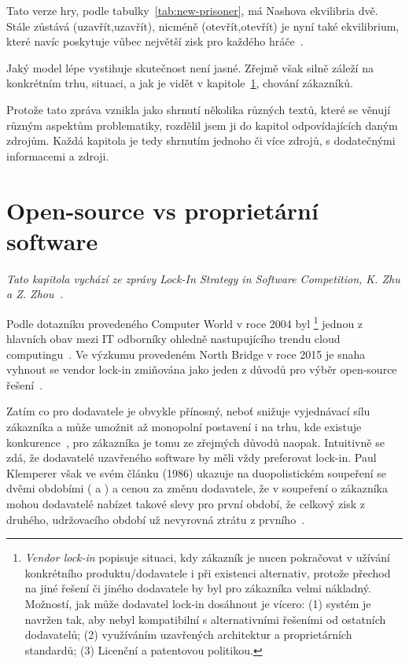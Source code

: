 \begin{multicols}{2}
Tato verze hry, podle tabulky~\ref{tab:new-prisoner}, má Nashova ekvilibria dvě. Stále zůstává (uzavřít,uzavřít), nicméně (otevřít,otevřít) je nyní také ekvilibrium, které navíc poskytuje vůbec největší zisk pro každého hráče~\cite{network-effects-opensource}.

Jaký model lépe vystihuje skutečnost není jasné. Zřejmě však silně záleží na konkrétním trhu, situaci, a jak je vidět v kapitole~\ref{ch:opensource-vs-proprietary}, chování zákazníků.


Protože tato zpráva vznikla jako shrnutí několika různých textů, které se věnují různým aspektům problematiky, rozdělil jsem ji do kapitol odpovídajících daným zdrojům. Každá kapitola je tedy shrnutím jednoho či více zdrojů, s dodatečnými informacemi a zdroji.




\section{Open-source vs proprietární software}
\label{ch:opensource-vs-proprietary}
	{\em Tato kapitola vychází ze zprávy Lock-In Strategy in Software Competition, K. Zhu a Z. Zhou~\cite{lock-in-competition}.}

	Podle dotazníku provedeného Computer World v roce 2004 byl \footnote{{\em Vendor lock-in} popisuje situaci, kdy zákazník je nucen pokračovat v užívání konkrétního produktu/dodavatele i při existenci alternativ, protože přechod na jiné řešení či jiného dodavatele by byl pro zákazníka velmi nákladný. Možností, jak může dodavatel lock-in dosáhnout je vícero: (1) systém je navržen tak, aby nebyl kompatibilní s alternativními řešeními od ostatních dodavatelů; (2) využíváním uzavřených architektur a proprietárních standardů; (3) Licenční a patentovou politikou.} jednou z hlavních obav mezi IT odborníky ohledně nastupujícího trendu cloud computingu~\cite{computer-world-2004}. Ve výzkumu provedeném North Bridge v roce 2015 je snaha vyhnout se vendor lock-in zmiňována jako jeden z důvodů pro výběr open-source řešení~\cite{survey-2015}.

	Zatím co pro dodavatele je  obvykle přínosný, neboť snižuje
	vyjednávací sílu zákazníka a může umožnit až monopolní postavení i na trhu,
	kde existuje konkurence~\cite[str. 1]{lock-in-competition}, pro zákazníka
	je tomu ze zřejmých důvodů naopak. Intuitivně se zdá, že dodavatelé
	uzavřeného software by měli vždy preferovat lock-in. Paul Klemperer však ve
	svém článku (1986) ukazuje na duopolistickém soupeření se dvěmi obdobími
	( a ) a cenou za změnu dodavatele, že v soupeření o zákazníka mohou dodavatelé nabízet takové slevy pro první období, že celkový zisk z druhého, udržovacího období už nevyrovná ztrátu z prvního~\cite{klemperer-switching-costs,lock-in-competition}.


\end{multicols}
